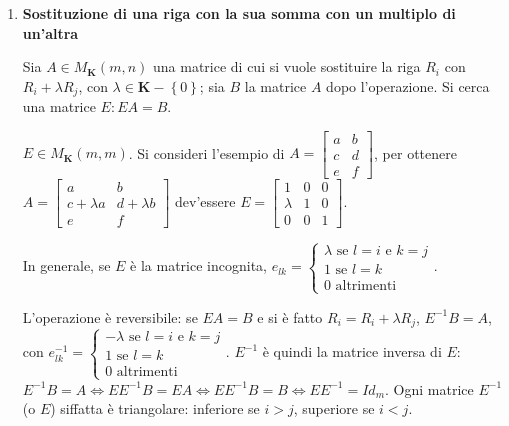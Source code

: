 \documentclass{article}
\begin{document}
\begin{enumerate}
\item \textbf{Sostituzione di una riga con la sua somma con un multiplo di
un'altra}

Sia $A\in M_{\mathbf{K}}\left( m,n\right) $ una matrice di cui si vuole
sostituire la riga $R_{i}$ con $R_{i}+\lambda R_{j}$, con $\lambda \in 
\mathbf{K}-\left\{ 0\right\} $; sia $B$ la matrice $A$ dopo l'operazione. Si
cerca una matrice $E:EA=B$.

$E\in M_{\mathbf{K}}\left( m,m\right) $. Si consideri l'esempio di $A=\left[ 
\begin{array}{cc}
a & b \\ 
c & d \\ 
e & f%
\end{array}%
\right] $, per ottenere $A=\left[ 
\begin{array}{cc}
a & b \\ 
c+\lambda a & d+\lambda b \\ 
e & f%
\end{array}%
\right] $ dev'essere $E=\left[ 
\begin{array}{ccc}
1 & 0 & 0 \\ 
\lambda & 1 & 0 \\ 
0 & 0 & 1%
\end{array}%
\right] $.

In generale, se $E$ \`{e} la matrice incognita, $e_{lk}=\left\{ 
\begin{array}{c}
\lambda \text{ se }l=i\text{ e }k=j \\ 
1\text{ se }l=k \\ 
0\text{ altrimenti}%
\end{array}%
\right. $.

L'operazione \`{e} reversibile: se $EA=B$ e si \`{e} fatto $%
R_{i}=R_{i}+\lambda R_{j}$, $E^{-1}B=A$, con $e_{lk}^{-1}=\left\{ 
\begin{array}{c}
-\lambda \text{ se }l=i\text{ e }k=j \\ 
1\text{ se }l=k \\ 
0\text{ altrimenti}%
\end{array}%
\right. $. $E^{-1}$ \`{e} quindi la matrice inversa di $E$: $%
E^{-1}B=A\Longleftrightarrow EE^{-1}B=EA\Longleftrightarrow
EE^{-1}B=B\Longleftrightarrow EE^{-1}=Id_{m}$. Ogni matrice $E^{-1}$ (o $E$)
siffatta \`{e} triangolare: inferiore se $i>j$, superiore se $i<j$.
\end{enumerate}
\end{document}
